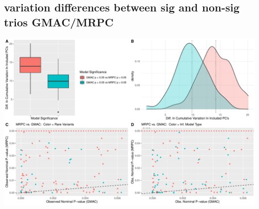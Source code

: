 \documentclass[
]{article}
\begin{document}
\hypertarget{variation-differences-between-sig-and-non-sig-trios-gmacmrpc}{%
\subsection{variation differences between sig and non-sig trios
GMAC/MRPC}\label{variation-differences-between-sig-and-non-sig-trios-gmacmrpc}}

\includegraphics{GMACwriteup2_files/figure-latex/unnamed-chunk-8-1.pdf}
\end{document}
